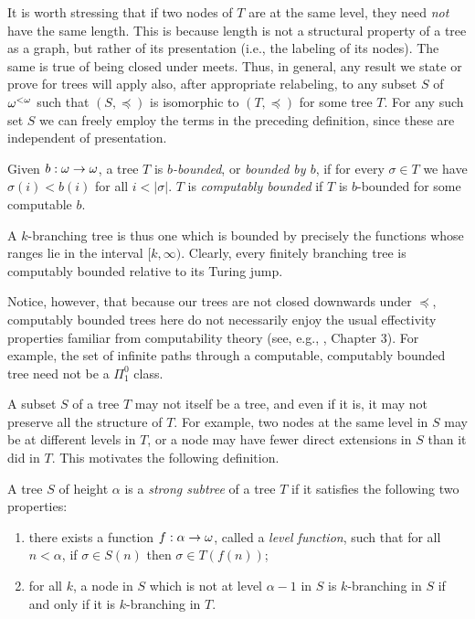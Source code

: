 \begin{remark}\label{rem:pseudotrees}
	It is worth stressing that if two nodes of $T$ are at the same level, they need \emph{not} have the same length. This is because length is not a structural property of a tree as a graph, but rather of its presentation  (i.e., the labeling of its nodes). The same is true of being closed under meets. Thus, in general, any result we state or prove for trees will apply also, after appropriate relabeling, to any subset $S$ of ${\omega^{<\omega}}$ such that $(S,\preceq)$ is isomorphic to $(T,\preceq)$ for some tree $T$. For any such set $S$ we can freely employ the terms in the preceding definition, since these are independent of presentation.
\end{remark}

\begin{definition}
Given $b:\omega\to\omega$, a tree $T$ is \emph{$b$-bounded}, or \emph{bounded by $b$}, if for every $\sigma \in T$ we have $\sigma(i) < b(i)$ for all $i < |\sigma|$. $T$ is \emph{computably bounded} if $T$ is $b$-bounded for some computable $b$.
\end{definition}

\noindent A $k$-branching tree is thus one which is bounded by precisely the functions whose ranges lie in the interval $[k,\infty)$. Clearly, every finitely branching tree is computably bounded relative to its Turing jump.

Notice, however, that because our trees are not closed downwards under $\preceq$, computably bounded trees here do not necessarily enjoy the usual effectivity properties familiar from computability theory (see, e.g., \cite{Soare2016Turing}, Chapter 3). For example, the set of infinite paths through a computable, computably bounded tree need not be a $\Pi^0_1$ class.

A subset $S$ of a tree $T$ may not itself be a tree, and even if it is, it may not preserve all the structure of $T$. For example, two nodes at the same level in $S$ may be at different levels in $T$, or a node may have fewer direct extensions in $S$ than it did in $T$. This motivates the following definition.

\begin{definition}\label{def:strong-subtree}
  A tree $S$ of height $\alpha$ is a \emph{strong subtree} of a tree $T$ if it satisfies the following two properties:
  \begin{enumerate}
  \item\label{pt:preserve-levels} there exists a function $f:\alpha\to\omega$, called a \emph{level function}, such that for all $n < \alpha$, if $\sigma \in S(n)$ then $\sigma \in T(f(n))$;
  \item\label{pt:preserve-branching} for all $k$, a node in $S$ which is not at level $\alpha-1$ in $S$ is $k$-branching in $S$ if and only if it is $k$-branching in $T$.
  \end{enumerate}
\end{definition}

